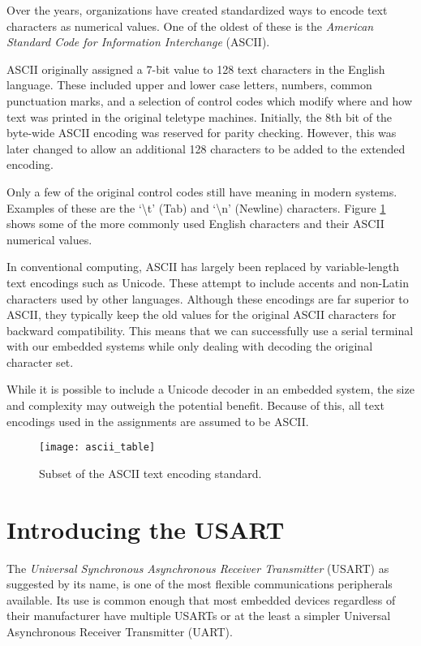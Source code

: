 \documentclass[openany,11pt,fleqn]{book} %
\begin{document}
Over the years, organizations have created standardized ways to encode text characters as numerical values. One of the oldest of these is the \textit{American Standard Code for Information Interchange} (ASCII). 

ASCII originally assigned a 7-bit value to 128 text characters in the English language. These included upper and lower case letters, numbers, common punctuation marks, and a selection of control codes which modify where and how text was printed in the original teletype machines. Initially, the 8th bit of the byte-wide ASCII encoding was reserved for parity checking. However, this was later changed to allow an additional 128 characters to be added to the extended encoding. 

Only a few of the original control codes still have meaning in modern systems. Examples of these are the `\textbackslash{}t' (Tab) and `\textbackslash{}n' (Newline) characters. Figure \ref{ascii_table} shows some of the more commonly used English characters and their ASCII numerical values.  

In conventional computing, ASCII has largely been replaced by variable-length text encodings such as Unicode. These attempt to include accents and non-Latin characters used by other languages. Although these encodings are far superior to ASCII, they typically keep the old values for the original ASCII characters for backward compatibility. This means that we can successfully use a serial terminal with our embedded systems while only dealing with decoding the original character set.

While it is possible to include a Unicode decoder in an embedded system, the size and complexity may outweigh the potential benefit. Because of this, all text encodings used in the assignments are assumed to be ASCII.

\begin{figure}[]
    \centering\texttt{[image: ascii\_table]}
    \caption{Subset of the ASCII text encoding standard.}
    \label{ascii_table}
\end{figure}


\section{Introducing the USART}
The \textit{Universal Synchronous Asynchronous Receiver Transmitter} (USART) as suggested by its name, is one of the most flexible communications peripherals available. Its use is common enough that most embedded devices regardless of their manufacturer have multiple USARTs or at the least a simpler Universal Asynchronous Receiver Transmitter (UART).
\end{document}
